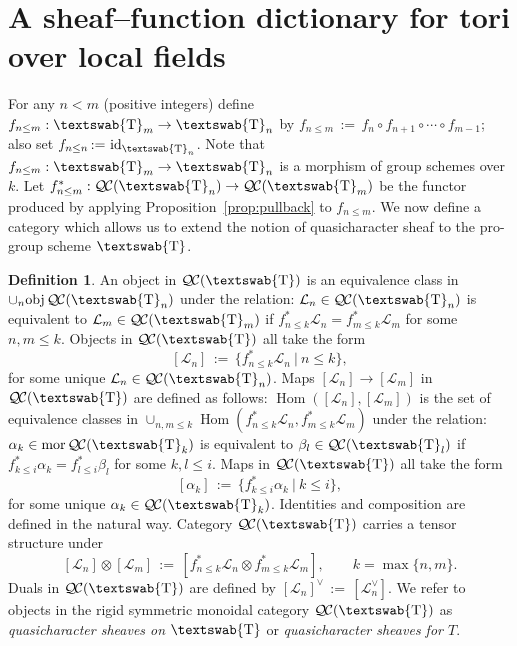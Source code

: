 \documentclass[11pt]{amsart}
\newcommand{\mathswab}[1]{\operatorname{\textswab{#1}}}
\theoremstyle{plain}
\theoremstyle{definition}
\newtheorem{definition}[theorem]{Definition}
\theoremstyle{remark}
\newcommand{\Fq}{k}
\DeclareMathOperator{\Hom}{Hom}
\DeclareMathOperator{\id}{id}
\newcommand{\ceq}{{\, :=\, }}
\newcommand{\tq}{{\ \vert\ }}
\newcommand{\obj}{{\text{obj}\, }}
\newcommand{\mor}{{\text{mor}\, }}
\newcommand{\GN}[1]{\mathswab{#1}}
\newcommand{\qcs}[1]{{\mathcal{#1}}}
\newcommand{\QC}{{\mathcal{Q\hskip-0.8pt C}}}
\begin{document}
\section{A sheaf--function dictionary for tori over local fields} \label{sec:quasichar} 


For any $n< m$ (positive integers) define $f_{n\leq m} : \GN{T}_{m} \to \GN{T}_{n}$ by $f_{n\leq m}\ceq f_n \circ f_{n+1} \circ \cdots \circ f_{m-1}$; also set $f_{n\leq n} \ceq \id_{\GN{T}_n}$.
Note that $f_{n\leq m}:  \GN{T}_{m} \to \GN{T}_{n}$ is a morphism of group schemes over $\Fq$.
Let $f_{n\leq m}^* : \QC(\GN{T}_n) \to \QC(\GN{T}_{m})$ be the functor produced by applying Proposition~\ref{prop:pullback} to $f_{n\leq m}$.
We now define a category which allows us to extend the notion of quasicharacter sheaf to the pro-group scheme $\GN{T}$. 

\begin{definition}
An object in $\QC(\GN{T})$ is an equivalence class in $\cup_{n} \obj \QC(\GN{T}_n)$ under the relation: $\qcs{L}_n\in \QC(\GN{T}_n)$ is equivalent to $\qcs{L}_{m}\in \QC(\GN{T}_m)$ if $f_{n\leq k}^* \qcs{L}_{n} = f_{m\leq k}^* \qcs{L}_m$ for some $n,m\leq k$. Objects in $\QC(\GN{T})$ all take the form
\[
[\qcs{L}_n] \ceq \{ f_{n\leq k}^* \qcs{L}_n \tq n\leq k\},
\]
for some unique $\qcs{L}_n \in \QC(\GN{T}_n)$.
Maps $[\qcs{L}_n] \to [\qcs{L}_m]$ in $\QC(\GN{T})$ are defined as follows:
$\Hom([\qcs{L}_n],[\qcs{L}_m])$ is the set of equivalence classes in $\cup_{n,m\leq k} \Hom(f_{n\leq k}^*\qcs{L}_n,f_{m\leq k}^*\qcs{L}_m)$ under the relation: $\alpha_k\in \mor \QC(\GN{T}_k)$ is equivalent to $\beta_l \in \QC(\GN{T}_l)$ if $f_{k\leq i}^*\alpha_k = f_{l\leq i}^* \beta_l$ for some $k,l\leq i$. Maps in $\QC(\GN{T})$ all take the form
\[
[\alpha_k] \ceq \{ f_{k\leq i}^* \alpha_k \tq k\leq i\},
\]
for some unique $\alpha_k \in \QC(\GN{T}_k)$.
Identities and composition are defined in the natural way.
Category $\QC(\GN{T})$ carries a tensor structure under
\[
[\qcs{L}_n]\otimes [\qcs{L}_m] \ceq [f_{n\leq k}^*\qcs{L}_n \otimes f_{m\leq k}^*\qcs{L}_m],
\qquad k = \max\{ n,m\}.
\]
Duals in $\QC(\GN{T})$ are defined by $[\qcs{L}_n]^\vee \ceq [\qcs{L}_n^\vee]$.
We refer to objects in the rigid symmetric monoidal category $\QC(\GN{T})$ as \emph{quasicharacter sheaves on $\GN{T}$} or \emph{quasicharacter sheaves for $T$}.
\end{definition}
\end{document}
